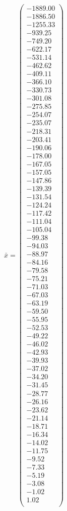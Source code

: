 \documentclass[a4paper,12pt]{article}
\begin{document}
$\bar { x } = \begin{pmatrix}
-1889.00 \\
-1886.50 \\
-1255.33 \\
-939.25 \\
-749.20 \\
-622.17 \\
-531.14 \\
-462.62 \\
-409.11 \\
-366.10 \\
-330.73 \\
-301.08 \\
-275.85 \\
-254.07 \\
-235.07 \\
-218.31 \\
-203.41 \\
-190.06 \\
-178.00 \\
-167.05 \\
-157.05 \\
-147.86 \\
-139.39 \\
-131.54 \\
-124.24 \\
-117.42 \\
-111.04 \\
-105.04 \\
-99.38 \\
-94.03 \\
-88.97 \\
-84.16 \\
-79.58 \\
-75.21 \\
-71.03 \\
-67.03 \\
-63.19 \\
-59.50 \\
-55.95 \\
-52.53 \\
-49.22 \\
-46.02 \\
-42.93 \\
-39.93 \\
-37.02 \\
-34.20 \\
-31.45 \\
-28.77 \\
-26.16 \\
-23.62 \\
-21.14 \\
-18.71 \\
-16.34 \\
-14.02 \\
-11.75 \\
-9.52 \\
-7.33 \\
-5.19 \\
-3.08 \\
-1.02 \\
1.02 \\
\end{pmatrix}
$
\end{document}
